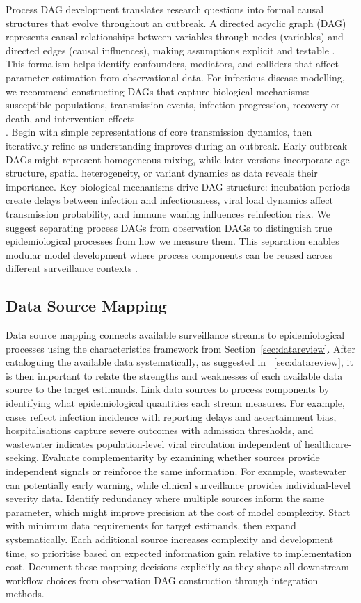 \documentclass{article}
\begin{document}
Process DAG development translates research questions into formal causal structures that evolve throughout an outbreak.
A directed acyclic graph (DAG) represents causal relationships between variables through nodes (variables) and directed edges (causal influences), making assumptions explicit and testable \citep{digitale2022tutorial}.
This formalism helps identify confounders, mediators, and colliders that affect parameter estimation from observational data.
For infectious disease modelling, we recommend constructing DAGs that capture biological mechanisms: susceptible populations, transmission events, infection progression, recovery or death, and intervention effects \\\citep{deangelis2018analysing}.
Begin with simple representations of core transmission dynamics, then iteratively refine as understanding improves during an outbreak.
Early outbreak DAGs might represent homogeneous mixing, while later versions incorporate age structure, spatial heterogeneity, or variant dynamics as data reveals their importance.
Key biological mechanisms drive DAG structure: incubation periods create delays between infection and infectiousness, viral load dynamics affect transmission probability, and immune waning influences reinfection risk.
We suggest separating process DAGs from observation DAGs to distinguish true epidemiological processes from how we measure them.
This separation enables modular model development where process components can be reused across different surveillance contexts \citep{nicholson2022interoperability}.

\subsection{Data Source Mapping}

Data source mapping connects available surveillance streams to epidemiological processes using the characteristics framework from Section~\ref{sec:datareview}.
After cataloguing the available data systematically, as suggested in ~\ref{sec:datareview},  it is then important to relate the strengths and weaknesses of each available data source to the target estimands.
Link data sources to process components by identifying what epidemiological quantities each stream measures. 
For example, cases reflect infection incidence with reporting delays and ascertainment bias, hospitalisations capture severe outcomes with admission thresholds, and wastewater indicates population-level viral circulation independent of healthcare-seeking.
Evaluate complementarity by examining whether sources provide independent signals or reinforce the same information.
For example, wastewater can potentially early warning, while clinical surveillance provides individual-level severity data.
Identify redundancy where multiple sources inform the same parameter, which might improve precision at the cost of model complexity.
Start with minimum data requirements for target estimands, then expand systematically.
Each additional source increases complexity and development time, so prioritise based on expected information gain relative to implementation cost.
Document these mapping decisions explicitly as they shape all downstream workflow choices from observation DAG construction through integration methods.
\end{document}
